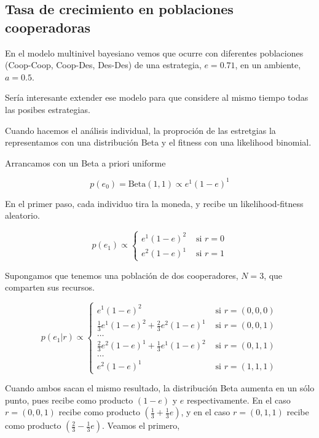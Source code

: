 \documentclass[a4paper,10pt]{article}
\begin{document}
\subsection{Tasa de crecimiento en poblaciones cooperadoras}

En el modelo multinivel bayesiano vemos que ocurre con diferentes  poblaciones (Coop-Coop, Coop-Des, Des-Des) de una estrategia, $e = 0.71$, en un ambiente, $a = 0.5$.

Sería interesante extender ese modelo para que considere al mismo tiempo todas las posibes estrategias.

Cuando hacemos el análisis individual, la proproción de las estretgias la representamos con una distribución Beta y el fitness con una likelihood binomial.

Arrancamos con un Beta a priori uniforme

\begin{equation}
p(e_0) = \text{Beta}(1,1) \propto e^1 (1-e)^1 
\end{equation}

En el primer paso, cada individuo tira la moneda, y recibe un likelihood-fitness aleatorio.

\begin{equation}
p(e_1) \propto 
\begin{cases}
e^1 (1-e)^2 & \text{ si } r = 0 \\
e^2 (1-e)^1 & \text{ si } r = 1
\end{cases}
\end{equation}

Supongamos que tenemos una población de dos cooperadores, $N=3$, que comparten sus recursos.

\begin{equation}
p(e_1|r) \propto 
\begin{cases}
e^1 (1-e)^2 & \text{ si } r = (0,0,0) \\
\frac{1}{3} e^1 (1-e)^2 + \frac{2}{3} e^2 (1-e)^1  & \text{ si } r = (0,0,1) \\
 \dots \\
\frac{2}{3} e^2 (1-e)^1 + \frac{1}{3} e^1 (1-e)^2    & \text{ si } r = (0,1,1) \\
\dots \\
e^2 (1-e)^1 & \text{ si } r = (1,1,1)
\end{cases}
\end{equation}

Cuando ambos sacan el mismo resultado, la distribución Beta aumenta en un sólo punto, pues recibe como producto $(1-e)$ y $e$ respectivamente.
En el caso $r = (0,0,1)$ recibe como producto $(\frac{1}{3} + \frac{1}{3}e )$, y en el caso $r = (0,1,1)$ recibe como producto $(\frac{2}{3} - \frac{1}{3}e )$.
Veamos el primero,
\end{document}
